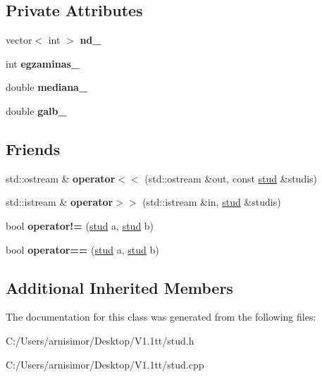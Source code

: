 \subsection*{Private Attributes}
\begin{DoxyCompactItemize}
\item 
\mbox{\label{classstud_afd9c83e634cbba566746099ae39279fc}} 
vector$<$ int $>$ {\bfseries nd\+\_\+}
\item 
\mbox{\label{classstud_a3673a5b1c8225b9c2e5049a30784df71}} 
int {\bfseries egzaminas\+\_\+}
\item 
\mbox{\label{classstud_a4c390d5ac45f29d6e9a405d402e5c19a}} 
double {\bfseries mediana\+\_\+}
\item 
\mbox{\label{classstud_a47faa07f7779a602d8c7730669ce5b04}} 
double {\bfseries galb\+\_\+}
\end{DoxyCompactItemize}
\subsection*{Friends}
\begin{DoxyCompactItemize}
\item 
\mbox{\label{classstud_aa2a7084e2439b94defe1567281ef35b8}} 
std\+::ostream \& {\bfseries operator$<$$<$} (std\+::ostream \&out, const \mbox{\hyperlink{classstud}{stud}} \&studis)
\item 
\mbox{\label{classstud_ad441ba6922b8fd5ca491dde4415ae0d6}} 
std\+::istream \& {\bfseries operator$>$$>$} (std\+::istream \&in, \mbox{\hyperlink{classstud}{stud}} \&studis)
\item 
\mbox{\label{classstud_a4e1856f0103abe9204f1d692471292be}} 
bool {\bfseries operator!=} (\mbox{\hyperlink{classstud}{stud}} a, \mbox{\hyperlink{classstud}{stud}} b)
\item 
\mbox{\label{classstud_a3a00adc52f575688f58d4391a551ec23}} 
bool {\bfseries operator==} (\mbox{\hyperlink{classstud}{stud}} a, \mbox{\hyperlink{classstud}{stud}} b)
\end{DoxyCompactItemize}
\subsection*{Additional Inherited Members}


The documentation for this class was generated from the following files\+:\begin{DoxyCompactItemize}
\item 
C\+:/\+Users/arnisimor/\+Desktop/\+V1.\+1tt/stud.\+h\item 
C\+:/\+Users/arnisimor/\+Desktop/\+V1.\+1tt/stud.\+cpp\end{DoxyCompactItemize}
